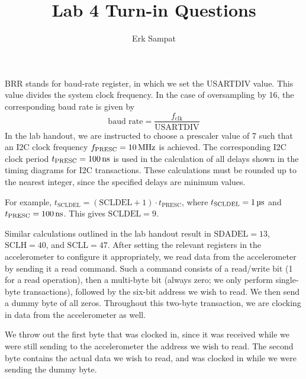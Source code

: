 

\title{Lab 4 Turn-in Questions}
\author{Erk Sampat}

\maketitle
\prob
BRR stands for baud-rate register, in which we set the USARTDIV value. This value divides the system clock frequency. In the case of oversampling by 16, the corresponding baud rate is given by
$$\text{baud rate} = \frac{f_{\text{clk}}}{\text{USARTDIV}}$$
\prob
In the lab handout, we are instructed to choose a prescaler value of 7 such that an I2C clock frequency $f_{\text{PRESC}}=\qty{10}{\mega\hertz}$ is achieved. The corresponding I2C clock period $t_{\text{PRESC}}=\qty{100}{\nano\second}$ is used in the calculation of all delays shown in the timing diagrams for I2C transactions. These calculations must be rounded up to the nearest integer, since the specified delays are minimum values.

For example, $t_{\text{SCLDEL}}=(\text{SCLDEL}+1)\cdot t_{\text{PRESC}}$, where $t_{\text{SCLDEL}}=\qty{1}{\micro\second}$ and $t_{\text{PRESC}}=\qty{100}{\nano\second}$. This gives $\text{SCLDEL}=9$.

Similar calculations outlined in the lab handout result in $\text{SDADEL}=13$, $\text{SCLH}=40$, and $\text{SCLL}=47$.
\prob
After setting the relevant registers in the accelerometer to configure it appropriately, we read data from the accelerometer by sending it a read command. Such a command consists of a read/write bit (1 for a read operation), then a multi-byte bit (always zero; we only perform single-byte transactions), followed by the six-bit address we wish to read. We then send a dummy byte of all zeros. Throughout this two-byte transaction, we are clocking in data from the accelerometer as well.

We throw out the first byte that was clocked in, since it was received while we were still sending to the accelerometer the address we wish to read. The second byte contains the actual data we wish to read, and was clocked in while we were sending the dummy byte.
